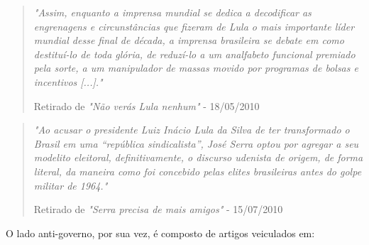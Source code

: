 \begin{enumerate}
\begin{quote}
\emph{"Assim, enquanto a imprensa mundial se dedica a decodificar as engrenagens e circunstâncias que fizeram de Lula o mais importante líder mundial desse final de década, a imprensa brasileira se debate em como destituí-lo de toda glória, de reduzí-lo a um analfabeto funcional premiado pela sorte, a um manipulador de massas movido por programas de bolsas e incentivos [...]."}

{\small Retirado de \emph{"Não verás Lula nenhum"} - 18/05/2010}
\end{quote}

\begin{quote}

\emph{"Ao acusar o presidente Luiz Inácio Lula da Silva de ter transformado o Brasil em uma “república sindicalista”, José Serra optou por agregar a seu modelito eleitoral, definitivamente, o discurso udenista de origem, de forma literal, da maneira como foi concebido pelas elites brasileiras antes do golpe militar de 1964."}

{\small Retirado de \emph{"Serra precisa de mais amigos"} - 15/07/2010}
\end{quote}
\end{enumerate}


O lado anti-governo, por sua vez, é composto de artigos veiculados em:

